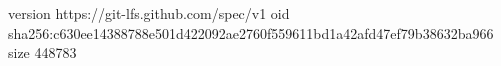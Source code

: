 version https://git-lfs.github.com/spec/v1
oid sha256:c630ee14388788e501d422092ae2760f559611bd1a42afd47ef79b38632ba966
size 448783
